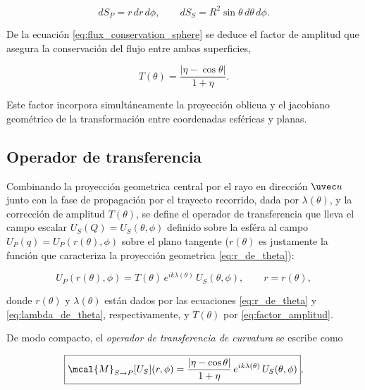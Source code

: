 \begin{equation}
dS_P = r\,dr\,d\phi, \qquad dS_S = R^2 \sin\theta\, d\theta\, d\phi.
\end{equation}

De la ecuación \eqref{eq:flux_conservation_sphere} se deduce el factor de amplitud que asegura la conservación del flujo entre ambas superficies,

\begin{equation}
T(\theta) = \frac{|\eta - \cos\theta|}{1 + \eta}.
\label{eq:factor_amplitud}
\end{equation}

Este factor incorpora simultáneamente la proyección oblicua y el jacobiano geométrico de la transformación entre coordenadas esféricas y planas.

\subsection{Operador de transferencia}
\label{subsec:operador_transferencia}

Combinando la proyección geometrica central por el rayo en dirección $\uvec u$ junto con la fase de propagación por el trayecto recorrido, dada por \(\lambda(\theta)\), y la corrección de amplitud \(T(\theta)\), se define el operador de transferencia que lleva el campo escalar \(U_S(Q) = U_S(\theta,\phi)\) definido sobre la esféra al campo \(U_P(q) = U_P(r(\theta),\phi)\) sobre el plano tangente (\(r(\theta)\) es justamente la función que caracteriza la proyección geometrica \eqref{eq:r_de_theta}):

\begin{equation}
U_P(r(\theta),\phi)
=
T(\theta)\,
e^{i k \lambda(\theta)}\,
U_S(\theta,\phi),
\qquad
r = r(\theta),
\label{eq:transferencia_campo_esfera_plano}
\end{equation}

donde \(r(\theta)\) y \(\lambda(\theta)\) están dados por las ecuaciones \eqref{eq:r_de_theta} y \eqref{eq:lambda_de_theta}, respectivamente, y \(T(\theta)\) por \eqref{eq:factor_amplitud}.  

De modo compacto, el \emph{operador de transferencia de curvatura} se escribe como

\begin{equation}
\boxed{
\mcal{M}_{S\to P}[U_S](r,\phi)
=
\frac{|\eta-\cos\theta|}{1+\eta}\,
e^{i k \lambda(\theta)}\,
U_S(\theta,\phi)
},
\label{eq:operador_transferencia_final}
\end{equation}

